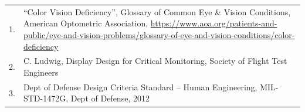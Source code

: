 \documentclass[
]{book}
\begin{document}
\begin{longtable}[]{@{}ll@{}}
\toprule
\endhead
\begin{minipage}[t]{0.01\columnwidth}\raggedright
1.\strut
\end{minipage} & \begin{minipage}[t]{0.93\columnwidth}\raggedright
``Color Vision Deficiency'', Glossary of Common Eye \& Vision Conditions, American Optometric Association, \url{https://www.aoa.org/patients-and-public/eye-and-vision-problems/glossary-of-eye-and-vision-conditions/color-deficiency}\strut
\end{minipage}\tabularnewline
\begin{minipage}[t]{0.01\columnwidth}\raggedright
2.\strut
\end{minipage} & \begin{minipage}[t]{0.93\columnwidth}\raggedright
C. Ludwig, Display Design for Critical Monitoring, Society of Flight Test Engineers\strut
\end{minipage}\tabularnewline
\begin{minipage}[t]{0.01\columnwidth}\raggedright
3.\strut
\end{minipage} & \begin{minipage}[t]{0.93\columnwidth}\raggedright
Dept of Defense Design Criteria Standard -- Human Engineering, MIL-STD-1472G, Dept of Defense, 2012\strut
\end{minipage}\tabularnewline
\bottomrule
\end{longtable}
\end{document}
